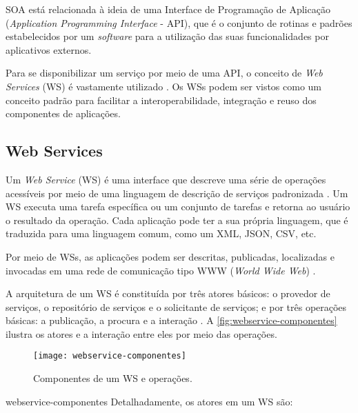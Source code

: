	SOA está relacionada à ideia de uma Interface de Programação de Aplicação (\textit{Application Programming Interface} - API), que é o conjunto de rotinas e padrões estabelecidos por um \textit{software} para a utilização das suas funcionalidades por aplicativos externos.
	
	Para se disponibilizar um serviço por meio de uma API, o conceito de \textit{Web Services} (WS) é vastamente utilizado \cite{souit2013soa}. Os WSs podem ser vistos como um conceito padrão para facilitar a interoperabilidade, integração e reuso dos componentes de aplicações.
	
	\subsection{Web Services}

	Um \textit{Web Service} (WS) é uma interface que descreve uma série de operações acessíveis por meio de uma linguagem de descrição de serviços padronizada \cite{gottschalk2002webservices}. Um WS executa uma tarefa específica ou um conjunto de tarefas e retorna ao usuário o resultado da operação. Cada aplicação pode ter a sua própria linguagem, que é traduzida para uma linguagem comum, como um XML, JSON, CSV, etc.
	
	Por meio de WSs, as aplicações podem ser descritas, publicadas, localizadas e invocadas em uma rede de comunicação tipo WWW (\textit{World Wide Web}) \cite{souit2013soa}.
	
	A arquitetura de um WS é constituída por três atores básicos: o provedor de serviços, o repositório de serviços e o solicitante de serviços; e por três operações básicas: a publicação, a procura e a interação \cite{gottschalk2002webservices}. A \autoref{fig:webservice-componentes} ilustra os atores e a interação entre eles por meio das operações.
	
	\begin{figure}[htb]
		\centering
		\caption{Componentes de um WS e operações.}
		\label{fig:webservice-componentes}
		\texttt{[image: webservice-componentes]}
	\end{figure}
	webservice-componentes
	Detalhadamente, os atores em um WS são:
	
